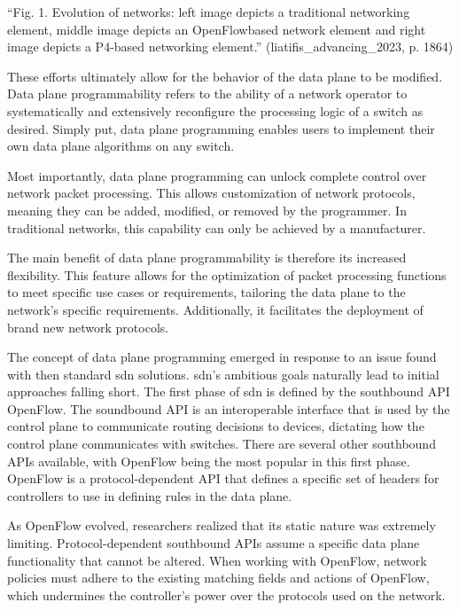 “Fig. 1. Evolution of networks: left image depicts a traditional networking element, middle image depicts an OpenFlowbased network element and right image depicts a P4-based networking element.” (liatifis_advancing_2023, p. 1864)

These efforts ultimately allow for the behavior of the data plane to be modified. Data plane programmability refers to the ability of a network operator to systematically and extensively reconfigure the processing logic of a switch as desired\cite{bifulco_survey_2018}. Simply put, data plane programming enables users to implement their own data plane algorithms on any switch. \cite{hauser_survey_2021}

Most importantly, data plane programming can unlock complete control over network packet processing. This allows customization of network protocols, meaning they can be added, modified, or removed by the programmer. In traditional networks, this capability can only be achieved by a manufacturer\cite{hauser_survey_2021}. 

The main benefit of data plane programmability is therefore its increased flexibility. This feature allows for the optimization of packet processing functions to meet specific use cases or requirements, tailoring the data plane to the network's specific requirements. Additionally, it facilitates the deployment of brand new network protocols. \cite{bifulco_survey_2018}

The concept of data plane programming emerged in response to an issue found with then standard \gls{sdn} solutions. \gls{sdn}'s ambitious goals naturally lead to initial approaches falling short. The first phase of \gls{sdn} is defined by the southbound API OpenFlow. The soundbound API is an interoperable interface that is used by the control plane to communicate routing decisions to devices, dictating how the control plane communicates with switches. There are several other southbound APIs available, with OpenFlow being the most popular in this first phase. OpenFlow is a protocol-dependent API that defines a specific set of headers for controllers to use in defining rules in the data plane. \cite{li_protocol_2017}

As OpenFlow evolved, researchers realized that its static nature was extremely limiting. Protocol-dependent southbound APIs assume a specific data plane functionality that cannot be altered. When working with OpenFlow, network policies must adhere to the existing matching fields and actions of OpenFlow, which undermines the controller's power over the protocols used on the network.  \cite{bosshart_p4_2014}\cite{hauser_survey_2021}\cite{li_protocol_2017}

